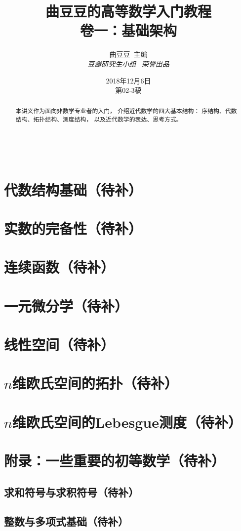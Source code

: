 \documentclass[a4paper, 11pt]{article} %
\title{\textbf{曲豆豆的高等数学入门教程}\\$\,$\\%
卷一：基础架构} %
\author{\textsc{曲豆豆\,\,\,主编} %
\\{\textit{豆瓣研究生小组\,\,\,\,\,荣誉出品}}} %
\date{2018年12月6日\\
第02-3稿} %
\makeatletter
\renewcommand{\maketitle}{ %
\begin{center} %
{\Huge\@title} %

\vspace{50pt} %

{\Large\@author} %
\\\@date %

\vspace{20pt} %
\end{center}
}
\makeatother
\begin{document}
\maketitle


\begin{abstract}
本讲义作为面向非数学专业者的入门，
介绍近代数学的四大基本结构：
序结构、代数结构、拓扑结构、测度结构，
以及近代数学的表达、思考方式。
\end{abstract}

\tableofcontents
\newpage

\newpage




\section{代数结构基础（待补）}
\section{实数的完备性（待补）}
\section{连续函数（待补）}
\section{一元微分学（待补）}
\section{线性空间（待补）}
\section{$n$维欧氏空间的拓扑（待补）}
\section{$n$维欧氏空间的Lebesgue测度（待补）}
\section{附录：一些重要的初等数学（待补）}
\subsection{求和符号与求积符号（待补）}
\subsection{整数与多项式基础（待补）}
\end{document}
